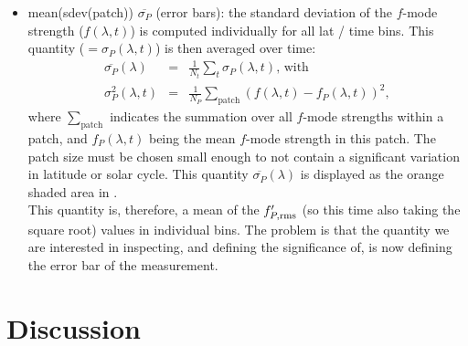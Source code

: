 \documentclass{aa}
\begin{document}
\begin{itemize}
\item mean(sdev(patch)) $\overline{\sigma_P}$ (error bars): the standard deviation of the $f$-mode strength
($f(\lambda,t)$)
 is computed individually for all lat / time bins. This quantity  ($=\sigma_P(\lambda,t)$) is then averaged over time:
\begin{eqnarray}
\overline{\sigma_P}(\lambda) &=&  \frac{1}{N_t} \sum_{t}  \sigma_P(\lambda,t) \mbox{, with} \\
\sigma_P^2(\lambda,t) &=& \frac{1}{N_P}\sum_{\mbox{patch}} ( f(\lambda,t)
- f_P(\lambda,t) )^2,
\end{eqnarray} 
where $\sum_{\mbox{patch}}$ indicates the summation over all $f$-mode strengths within a patch, and $f_P(\lambda,t)$ being the mean $f$-mode strength in this patch. The patch size must be chosen small enough to not contain a significant variation in latitude or solar cycle. 
This quantity $\overline{\sigma_P}(\lambda)$ is displayed as the orange shaded area in .\\
This quantity is, therefore, a mean of the $f'_{P, {\rm rms}}$ (so this time also taking the square root) values in individual bins. The problem is that the quantity we are interested in inspecting, and defining the significance of, is now defining the error bar of the measurement. 
\end{itemize}





\section{Discussion}


{}

\end{document}
